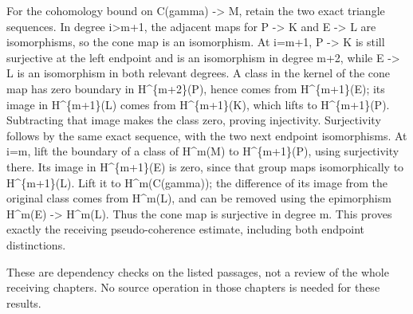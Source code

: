For the cohomology bound on C(gamma)\allowbreak{} \allowbreak{}-> M,\allowbreak{} retain the two exact triangle sequences. In degree i>m\allowbreak{}+1,\allowbreak{} the adjacent maps for P \allowbreak{}-> K and E \allowbreak{}-> L are isomorphisms,\allowbreak{} so the cone map is an isomorphism. At i\allowbreak{}=m\allowbreak{}+1,\allowbreak{} P \allowbreak{}-> K is still surjective at the left endpoint and is an isomorphism in degree m\allowbreak{}+2,\allowbreak{} while E \allowbreak{}-> L is an isomorphism in both relevant degrees. A class in the kernel of the cone map has zero boundary in H\textasciicircum{}\{m\allowbreak{}+2\}(P)\allowbreak{},\allowbreak{} hence comes from H\textasciicircum{}\{m\allowbreak{}+1\}(E)\allowbreak{}; its image in H\textasciicircum{}\{m\allowbreak{}+1\}(L)\allowbreak{} comes from H\textasciicircum{}\{m\allowbreak{}+1\}(K)\allowbreak{},\allowbreak{} which lifts to H\textasciicircum{}\{m\allowbreak{}+1\}(P)\allowbreak{}. Subtracting that image makes the class zero,\allowbreak{} proving injectivity. Surjectivity follows by the same exact sequence,\allowbreak{} with the two next endpoint isomorphisms. At i\allowbreak{}=m,\allowbreak{} lift the boundary of a class of H\textasciicircum{}m(M)\allowbreak{} to H\textasciicircum{}\{m\allowbreak{}+1\}(P)\allowbreak{},\allowbreak{} using surjectivity there. Its image in H\textasciicircum{}\{m\allowbreak{}+1\}(E)\allowbreak{} is zero,\allowbreak{} since that group maps isomorphically to H\textasciicircum{}\{m\allowbreak{}+1\}(L)\allowbreak{}. Lift it to H\textasciicircum{}m(C(gamma)\allowbreak{})\allowbreak{}; the difference of its image from the original class comes from H\textasciicircum{}m(L)\allowbreak{},\allowbreak{} and can be removed using the epimorphism H\textasciicircum{}m(E)\allowbreak{} \allowbreak{}-> H\textasciicircum{}m(L)\allowbreak{}. Thus the cone map is surjective in degree m. This proves exactly the receiving pseudo-coherence estimate,\allowbreak{} including both endpoint distinctions.

These are dependency checks on the listed passages,\allowbreak{} not a review of the whole receiving chapters. No source operation in those chapters is needed for these results.
